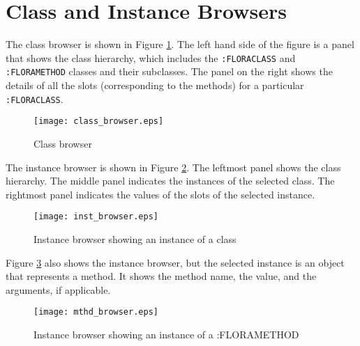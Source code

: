 \section{Class and Instance Browsers}

The class browser is shown in Figure \ref{fig:flora-cls_browser}.
The left hand side of the figure is a panel that shows the class
hierarchy, which includes the {\tt :FLORACLASS} and {\tt
:FLORAMETHOD} classes and their subclasses. The panel on the right
shows the details of all the slots (corresponding to the \FLSYSTEM
methods) for a particular {\tt :FLORACLASS}.
\begin{figure}
\begin{center}
\texttt{[image: class\_browser.eps]}
\caption{Class browser} \label{fig:flora-cls_browser}
\end{center}
\end{figure}

The instance browser is shown in Figure \ref{fig:flora-inst1}. The
leftmost panel shows the class hierarchy. The middle panel indicates
the instances of the selected class. The rightmost panel indicates
the values of the slots of the selected instance.

\begin{figure}
\begin{center}
\texttt{[image: inst\_browser.eps]}
\caption{Instance browser showing an instance of a \FLSYSTEM class}
\label{fig:flora-inst1}
\end{center}
\end{figure}

Figure \ref{fig:flora-inst2} also shows the instance browser, but
the selected instance is an object that represents a \FLSYSTEM method.
It shows the method name, the value, and the arguments, if
applicable.
\begin{figure}
\begin{center}
\texttt{[image: mthd\_browser.eps]}
\caption{Instance browser showing an instance of a :FLORAMETHOD}
\label{fig:flora-inst2}
\end{center}
\end{figure}

